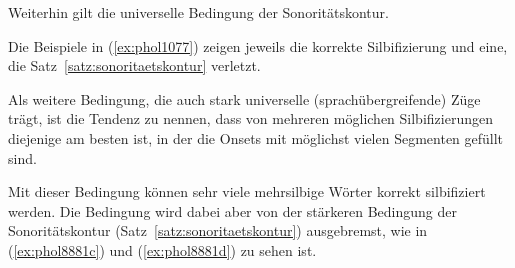 \begin{exe}
  \ex\label{ex:phol7279}
  \begin{xlist}
  \end{xlist}
\end{exe}

Weiterhin gilt die universelle Bedingung der Sonoritätskontur.


Die Beispiele in (\ref{ex:phol1077}) zeigen jeweils die korrekte Silbifizierung und eine, die Satz~\ref{satz:sonoritaetskontur} verletzt.

\begin{exe}
  \ex\label{ex:phol1077}
  \begin{xlist}
  \end{xlist}
\end{exe}

Als weitere Bedingung, die auch stark universelle (sprachübergreifende) Züge trägt, ist die Tendenz zu nennen, dass von mehreren möglichen Silbifizierungen diejenige am besten ist, in der die Onsets mit möglichst vielen Segmenten gefüllt sind.


Mit dieser Bedingung können sehr viele mehrsilbige Wörter korrekt silbifiziert werden.
Die Bedingung wird dabei aber von der stärkeren Bedingung der Sonoritätskontur (Satz~\ref{satz:sonoritaetskontur}) ausgebremst, wie in (\ref{ex:phol8881c}) und (\ref{ex:phol8881d}) zu sehen ist.

\begin{exe}
  \ex\label{ex:phol8881}
  \begin{xlist}
  \end{xlist}
\end{exe}

